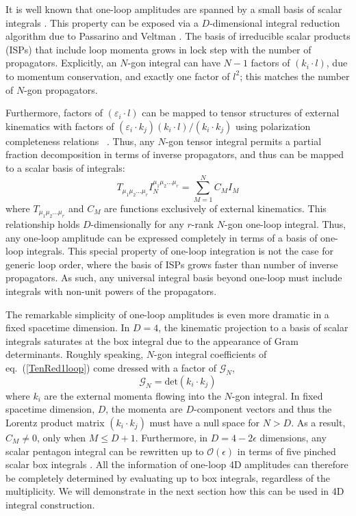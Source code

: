 \documentclass[11pt,letter]{article}
\def\eqn#1{eq.~(\ref{#1})}
\begin{document}
It is well known that one-loop amplitudes are spanned by a small basis of scalar integrals \cite{Forde:2007mi,Badger:2008cm,ElvangHuangReview}. This property can be exposed via a $D$-dimensional integral reduction algorithm due to Passarino and Veltman \cite{Passarino:1978jh}. The basis of irreducible scalar products (ISPs) that include loop momenta grows in lock step with the number of propagators. Explicitly, an $N$-gon integral can have $N-1$ factors of $(k_i\cdot l)$, due to momentum conservation, and exactly one factor of $l^2$; this matches the number of $N$-gon propagators. 

Furthermore, factors of $(\varepsilon_i\cdot l)$ can be mapped to tensor structures of external kinematics with factors of $(\varepsilon_i \cdot k_j)(k_i  \cdot l)/(k_i \cdot k_j)$ using polarization completeness relations~\cite{Bern:2017tuc} . Thus, any $N$-gon tensor integral permits a partial fraction decomposition in terms of inverse propagators, and thus can be mapped to a scalar basis of integrals:
\begin{equation}\label{TenRed1loop}
T_{\mu_1\mu_2...\mu_r} I_N^{\mu_1\mu_2...\mu_r} = \sum_{M=1}^N C_M I_M
\end{equation}
where $T_{\mu_1\mu_2...\mu_r}$ and $C_M$ are functions exclusively of external kinematics. This relationship holds $D$-dimensionally for any $r$-rank $N$-gon one-loop integral. Thus, any one-loop amplitude can be expressed completely in terms of a basis of one-loop integrals. This special property of one-loop integration is {not} the case for generic loop order, where the basis of ISPs grows faster than number of inverse propagators. As such, any universal integral basis beyond one-loop must include integrals with non-unit powers of the propagators.  

The remarkable simplicity of one-loop amplitudes is even more dramatic in a fixed spacetime dimension. In $D=4$, the kinematic projection to a basis of scalar integrals saturates at the box integral due to the appearance of Gram determinants. Roughly speaking, $N$-gon integral coefficients of \eqn{TenRed1loop} come dressed with a factor of $\mathcal{G}_N$,
\begin{equation}
\mathcal{G}_N = \text{det} (k_i \cdot k_j)
\end{equation}
where $k_i$ are the external momenta flowing into the $N$-gon integral. In fixed spacetime dimension, $D$, the momenta are $D$-component vectors and thus the Lorentz product matrix $(k_i \cdot k_j)$ must have a null space for $N>D$. As a result, $C_M \neq 0$, only when $M\leq D+1$. Furthermore, in $D=4-2\epsilon$ dimensions, any scalar pentagon integral can be rewritten up to $\mathcal{O}(\epsilon)$ in terms of five pinched scalar box integrals \cite{Bern:1993kr}. All the information of one-loop 4D amplitudes can therefore be completely determined by evaluating up to box integrals, regardless of the multiplicity. We will demonstrate in the next section how this can be used in 4D integral construction.  
\end{document}
